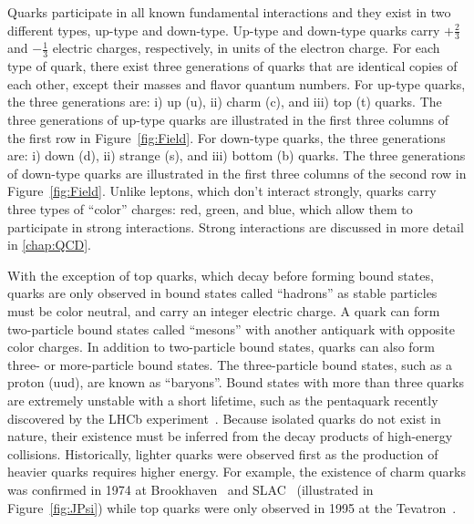 Quarks participate in all known fundamental interactions and they exist in two different types, up-type and down-type. Up-type and down-type quarks carry $+\frac{2}{3}$ and $-\frac{1}{3}$ electric charges, respectively, in units of the electron charge. For each type of quark, there exist three generations of quarks that are identical copies of each other, except their masses and flavor quantum numbers. For up-type quarks, the three generations are: i) up (u), ii) charm (c), and iii) top (t) quarks. The three generations of up-type quarks are illustrated in the first three columns of the first row in Figure~\ref{fig:Field}. For down-type quarks, the three generations are: i) down (d), ii) strange (s), and iii) bottom (b) quarks. The three generations of down-type quarks are illustrated in the first three columns of the second row in Figure~\ref{fig:Field}. Unlike leptons, which don't interact strongly, quarks carry three types of ``color'' charges: red, green, and blue, which allow them to participate in strong interactions. Strong interactions are discussed in more detail in \autoref{chap:QCD}.

With the exception of top quarks, which decay before forming bound states, quarks are only observed in bound states called ``hadrons'' as stable particles must be color neutral, and carry an integer electric charge. A quark can form two-particle bound states called ``mesons'' with another antiquark with opposite color charges. In addition to two-particle bound states, quarks can also form three- or more-particle bound states. The three-particle bound states, such as a proton (uud), are known as ``baryons''. Bound states with more than three quarks are extremely unstable with a short lifetime, such as the pentaquark recently discovered by the \ac{LHCb} experiment~\cite{LHCb:2015yax}. Because isolated quarks do not exist in nature, their existence must be inferred from the decay products of high-energy collisions. Historically, lighter quarks were observed first as the production of heavier quarks requires higher energy. For example, the existence of charm quarks was confirmed in 1974 at Brookhaven~\cite{E598:1974sol} and SLAC~\cite{SLAC-SP-017:1974ind} (illustrated in Figure~\ref{fig:JPsi}) while top quarks were only observed in 1995 at the Tevatron~\cite{CDF:1995wbb,D0:1995jca}.

